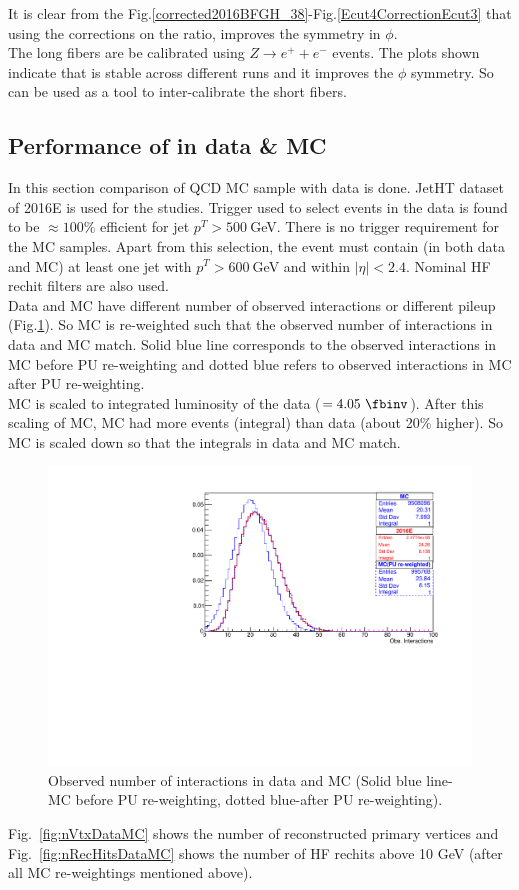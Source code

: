 It is clear from the Fig.\ref{corrected2016BFGH_38}-Fig.\ref{Ecut4CorrectionEcut3} that using the corrections on the ratio, improves the symmetry in $\phi$.\\
The long fibers are be calibrated using $Z\rightarrow e^+ + e^-$ events. The plots shown indicate that \ratiosl is stable across different runs and it improves the $\phi$ symmetry. So \ratiosl can be used as a tool to inter-calibrate the short fibers.


\subsection{Performance of \ratiosl in data \& MC}\label{sec:ana25ns}
In this section comparison of QCD MC sample with data is done. JetHT dataset of 2016E is used for the studies. Trigger used to select events in the data is found to be $\approx 100\%$ efficient for jet $p^T>500~$GeV. There is no trigger requirement for the MC samples. Apart from this selection, the event must contain (in both data and MC) at least one jet with $p^T>600~$GeV and within $|\eta|<2.4$. Nominal HF rechit filters are also used.\\
Data and MC have different number of observed interactions or different pileup (Fig.\ref{fig:DataMCobsIntPUWt}). So MC is re-weighted such that the observed number of interactions in data and MC match. 
Solid blue line corresponds to the observed interactions in MC before PU re-weighting and dotted blue refers to observed interactions in MC after PU re-weighting.\\
MC is scaled to integrated luminosity of the data ($=4.05\ \fbinv$). After this scaling of MC, MC had more events (integral) than data (about 20\% higher). So MC is scaled down so that the integrals in data and MC match. 

\begin{figure}[h!]
\centering
\includegraphics[width=0.7\linewidth]{../Figures/Chap2/ImageFiles_HF/BasicPics/DataMC/DataMCobsIntPUWt}
\captionsetup{width=.9\linewidth}
\caption{Observed number of interactions in data and MC (Solid blue line- MC before PU re-weighting, dotted blue-after PU re-weighting).}
\label{fig:DataMCobsIntPUWt}
\end{figure}
Fig.~\ref{fig:nVtxDataMC} shows the number of reconstructed primary vertices and Fig.~\ref{fig:nRecHitsDataMC} shows the number of HF rechits above 10 GeV (after all MC re-weightings mentioned above).

